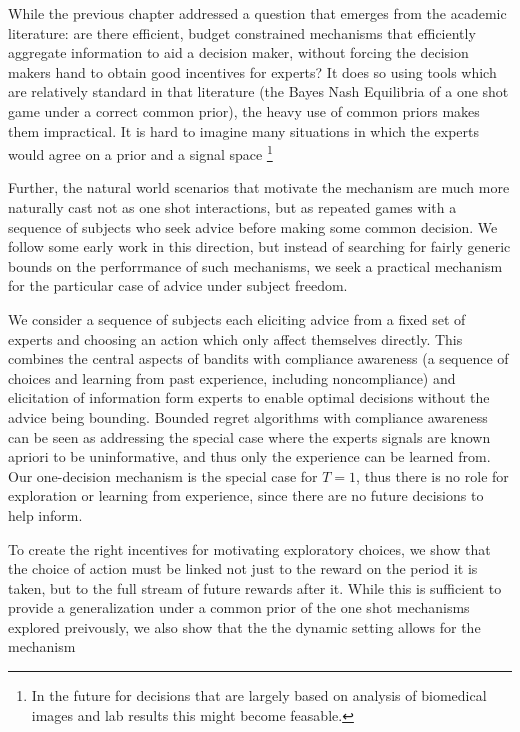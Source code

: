 

While the previous chapter addressed a question that emerges from the academic literature: are there efficient, budget constrained mechanisms that efficiently aggregate information to aid a decision maker, without forcing the decision makers hand to obtain good incentives for experts? It does so using tools which are relatively standard in that literature (the Bayes Nash Equilibria of a one shot game under a correct common prior), the heavy use of common priors makes them impractical. It is hard to imagine many situations in which the experts would agree on a prior and a signal space \footnote{In the future for decisions that are largely based on analysis of biomedical images and lab results this might become feasable.}

Further, the natural world scenarios that motivate the mechanism are much more naturally cast not as one shot interactions, but as repeated games with a sequence of subjects who seek advice before making some common decision. 
We follow some early work in this direction, but instead of searching for fairly generic bounds on the perforrmance of such mechanisms, we seek a practical mechanism for the particular case of advice under subject freedom.

We consider a sequence of subjects each eliciting advice from a fixed set of experts and choosing an action which only affect themselves directly. This combines the central aspects of bandits with compliance awareness (a sequence of choices and learning from past experience, including noncompliance) and elicitation of information form experts to enable optimal decisions without the advice being bounding. 
Bounded regret algorithms with compliance awareness can be seen as addressing the special case where the experts signals are known apriori to be uninformative, and thus only the experience can be learned from. Our one-decision mechanism is the special case for $T={1}$, thus there is no role for exploration or learning from experience, since there are no future decisions  to help inform.


To create the right incentives for motivating exploratory choices, we show that the choice of action must be linked not just to the reward on the period it is taken, but to the full stream of future rewards after it. While this is sufficient to provide a generalization under a common prior of the one shot mechanisms explored preivously, we also show that the the dynamic setting allows for the mechanism 

